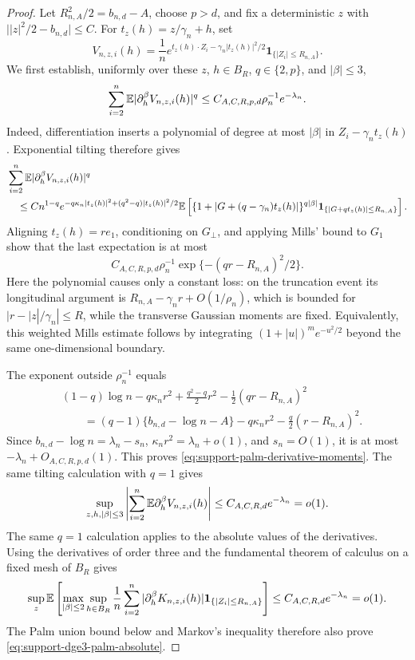 \begin{proof}
Let \(R_{n,A}^2/2=b_{n,d}-A\), choose \(p>d\), and fix a deterministic
\(z\) with \(\bigl||z|^2/2-b_{n,d}\bigr|\le C\).  For
\(t_z(h)=z/\gamma_n+h\), set
\[
 V_{n,z,i}(h)=\frac1n
 e^{t_z(h)\cdot Z_i-\gamma_n|t_z(h)|^2/2}
 \mathbf 1_{\{|Z_i|\le R_{n,A}\}}.
\]
We first establish, uniformly over these \(z\), \(h\in B_R\),
\(q\in\{2,p\}\), and \(|\beta|\le3\),
\begin{equation}
\label{eq:support-palm-derivative-moments}
 \sum_{i=2}^n
 \mathbb E|\partial_h^\beta V_{n,z,i}(h)|^q
 \le C_{A,C,R,p,d}\rho_n^{-1}e^{-\lambda_n}.
\end{equation}
Indeed, differentiation inserts a polynomial of degree at most \(|\beta|\)
in \(Z_i-\gamma_nt_z(h)\).  Exponential tilting therefore gives
\begin{align*}
 &\sum_{i=2}^n
 \mathbb E|\partial_h^\beta V_{n,z,i}(h)|^q\\
 &\quad\le
 C n^{1-q}e^{-q\kappa_n|t_z(h)|^2+(q^2-q)|t_z(h)|^2/2}
 \mathbb E\left[
  \{1+|G+(q-\gamma_n)t_z(h)|\}^{q|\beta|}
  \mathbf1_{\{|G+qt_z(h)|\le R_{n,A}\}}
 \right].
\end{align*}
Aligning \(t_z(h)=re_1\), conditioning on \(G_\perp\), and applying Mills'
bound to \(G_1\) show that the last expectation is at most
\[
 C_{A,C,R,p,d}\rho_n^{-1}
   \exp\{-(qr-R_{n,A})^2/2\}.
\]
Here the polynomial causes only a constant loss: on the truncation event its
longitudinal argument is
\(R_{n,A}-\gamma_nr+O(1/\rho_n)\), which is bounded for
\(|r-|z|/\gamma_n|\le R\), while the transverse Gaussian moments are fixed.
Equivalently, this weighted Mills estimate follows by integrating
\((1+|u|)^m e^{-u^2/2}\) beyond the same one-dimensional boundary.

The exponent outside \(\rho_n^{-1}\) equals
\begin{align*}
 &(1-q)\log n-q\kappa_nr^2
   +\frac{q^2-q}{2}r^2-\frac12(qr-R_{n,A})^2\\
 &\qquad=(q-1)\{b_{n,d}-\log n-A\}
   -q\kappa_nr^2-\frac q2(r-R_{n,A})^2.
\end{align*}
Since \(b_{n,d}-\log n=\lambda_n-s_n\),
\(\kappa_nr^2=\lambda_n+o(1)\), and \(s_n=O(1)\), it is at most
\(-\lambda_n+O_{A,C,R,p,d}(1)\).  This proves
\eqref{eq:support-palm-derivative-moments}.  The same tilting calculation with
\(q=1\) gives
\begin{equation}
\label{eq:support-palm-derivative-means}
 \sup_{z,h,|\beta|\le3}
 \left|\sum_{i=2}^n\mathbb E\partial_h^\beta V_{n,z,i}(h)\right|
 \le C_{A,C,R,d}e^{-\lambda_n}=o(1).
\end{equation}
The same \(q=1\) calculation applies to the absolute values of the
derivatives.  Using the derivatives of order three and the fundamental theorem
of calculus on a fixed mesh of \(B_R\) gives
\[
 \sup_z\mathbb E\left[
  \max_{|\beta|\le2}\sup_{h\in B_R}
  \frac1n\sum_{i=2}^n
  |\partial_h^\beta K_{n,z,i}(h)|
  \mathbf1_{\{|Z_i|\le R_{n,A}\}}
 \right]
 \le C_{A,C,R,d}e^{-\lambda_n}=o(1).
\]
The Palm union bound below and Markov's inequality therefore also prove
\eqref{eq:support-dge3-palm-absolute}.


\end{proof}
